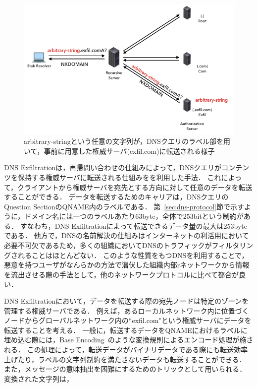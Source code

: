 \begin{figure}[h]
 \centering
 \includegraphics[width=12.0cm]{figure/dns-exfiltration.png}
 \caption{arbitrary-stringという任意の文字列が，DNSクエリのラベル部を用いて，事前に用意した権威サーバ(exfil.com)に転送される様子}
 \label{fig:dns-exfiltration}
\end{figure}

DNS Exfiltrationは，再帰問い合わせの仕組みによって，DNSクエリがコンテンツを保持する権威サーバに転送される仕組みをを利用した手法．
これによって，クライアントから権威サーバを宛先とする方向に対して任意のデータを転送することができる．
データを転送するためのキャリアは，DNSクエリのQuestion SectionのQNAME内のラベルである．
第~\ref{sec:dns-protocol}節で示すように，ドメイン名には一つのラベルあたり63byte，全体で253bitという制約がある．
すなわち，DNS Exfiltrationによって転送できるデータ量の最大は253byteである．
他方で，DNSの名前解決の仕組みはインターネットの利活用において必要不可欠であるため，多くの組織においてDNSのトラフィックがフィルタリングされることはほとんどない．
このような性質をもつDNSを利用することで，悪意を持つユーザがなんらかの方法で潜伏した組織内部rネットワークから情報を流出させる際の手法として，他のネットワークプロトコルに比べて都合が良い．

DNS Exfiltrationにおいて，データを転送する際の宛先ノードは特定のゾーンを管理する権威サーバである．
例えば，あるローカルネットワーク内に位置づくノードからグローバルネットワーク内の``exfil.com"という権威サーバにデータを転送することを考える．
一般に，転送するデータをQNAMEにおけるラベルに埋め込む際には，Base Encoding~\cite{rfc4648}のような変換規則によるエンコード処理が施される．
この処理によって，転送データがバイナリデータである際にも転送効率上げたり，ラベルの文字列制約を満たさないデータも転送することができる．
また，メッセージの意味抽出を困難にするためのトリックとして用いられる．
変換された文字列は，


